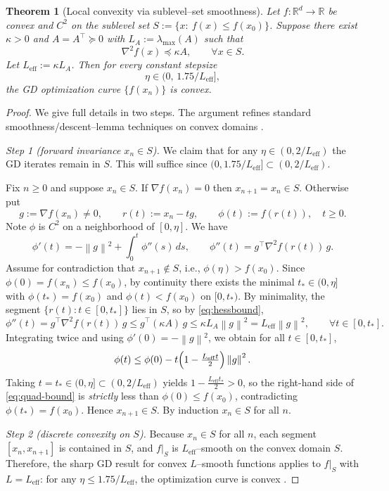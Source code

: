 \documentclass[11pt]{article}
\theoremstyle{plain}
\newtheorem{theorem}{Theorem}[section]
\theoremstyle{remark}
\newcommand{\R}{\mathbb{R}}
\newcommand{\norm}[1]{\left\lVert #1\right\rVert}
\begin{document}
\begin{theorem}[Local convexity via sublevel--set smoothness]\label{thm:local}
Let $f:\R^d\to\R$ be convex and $C^2$ on the sublevel set $S:=\{x:\ f(x)\le f(x_0)\}$. 
Suppose there exist $\kappa>0$ and $A=A^\top\succeq0$ with $L_A:=\lambda_{\max}(A)$ such that
\begin{equation}\label{eq:hessbound}
\nabla^2 f(x)\preceq \kappa A,\qquad \forall x\in S.
\end{equation}
Let $L_{\mathrm{eff}}:=\kappa L_A$. Then for every constant stepsize
\[
\eta\in\bigl(0,\,1.75/L_{\mathrm{eff}}\bigr],
\]
the GD optimization curve $\{f(x_n)\}$ is convex.
\end{theorem}

\begin{proof}
We give full details in two steps. The argument refines standard smoothness/descent--lemma techniques on convex domains \cite{Nesterov2004,Bubeck2015,Nesterov2018}.

\emph{Step 1 (forward invariance $x_n\in S$).}
We claim that for any $\eta\in(0,2/L_{\mathrm{eff}})$ the GD iterates remain in $S$. This will suffice since $(0,1.75/L_{\mathrm{eff}}]\subset(0,2/L_{\mathrm{eff}})$.

Fix $n\ge0$ and suppose $x_n\in S$. If $\nabla f(x_n)=0$ then $x_{n+1}=x_n\in S$. Otherwise put
\[
g:=\nabla f(x_n)\ne0,\qquad r(t):=x_n-tg,\qquad \phi(t):=f(r(t)),\quad t\ge0.
\]
Note $\phi$ is $C^2$ on a neighborhood of $[0,\eta]$. We have
\[
\phi'(t)=-\norm{g}^2+\int_0^t \phi''(s)\,ds,\qquad
\phi''(t)=g^\top \nabla^2 f(r(t))\,g.
\]
Assume for contradiction that $x_{n+1}\notin S$, i.e., $\phi(\eta)>f(x_0)$. Since $\phi(0)=f(x_n)\le f(x_0)$, by continuity there exists the minimal $t_\ast\in(0,\eta]$ with $\phi(t_\ast)=f(x_0)$ and $\phi(t)<f(x_0)$ on $[0,t_\ast)$. By minimality, the segment $\{r(t):t\in[0,t_\ast]\}$ lies in $S$, so by \eqref{eq:hessbound},
\[
\phi''(t)=g^\top \nabla^2 f(r(t))\,g\le g^\top (\kappa A)\,g\le \kappa L_A \norm{g}^2=L_{\mathrm{eff}}\norm{g}^2,\qquad \forall t\in[0,t_\ast].
\]
Integrating twice and using $\phi'(0)=-\norm{g}^2$, we obtain for all $t\in[0,t_\ast]$,
\begin{equation}\label{eq:quad-bound}
\phi(t)\le \phi(0)-t\Bigl(1-\tfrac{L_{\mathrm{eff}}t}{2}\Bigr)\norm{g}^2.
\end{equation}
Taking $t=t_\ast\in(0,\eta]\subset(0,2/L_{\mathrm{eff}})$ yields $1-\tfrac{L_{\mathrm{eff}}t_\ast}{2}>0$, so the right-hand side of \eqref{eq:quad-bound} is \emph{strictly} less than $\phi(0)\le f(x_0)$, contradicting $\phi(t_\ast)=f(x_0)$. Hence $x_{n+1}\in S$. By induction $x_n\in S$ for all $n$.

\emph{Step 2 (discrete convexity on $S$).}
Because $x_n\in S$ for all $n$, each segment $[x_n,x_{n+1}]$ is contained in $S$, and $f|_S$ is $L_{\mathrm{eff}}$--smooth on the convex domain $S$. Therefore, the sharp GD result for convex $L$--smooth functions applies to $f|_S$ with $L=L_{\mathrm{eff}}$: for any $\eta\le 1.75/L_{\mathrm{eff}}$, the optimization curve is convex \cite[Thm.~1]{BarzilaiShamirZamani2025}.
\end{proof}
\end{document}
